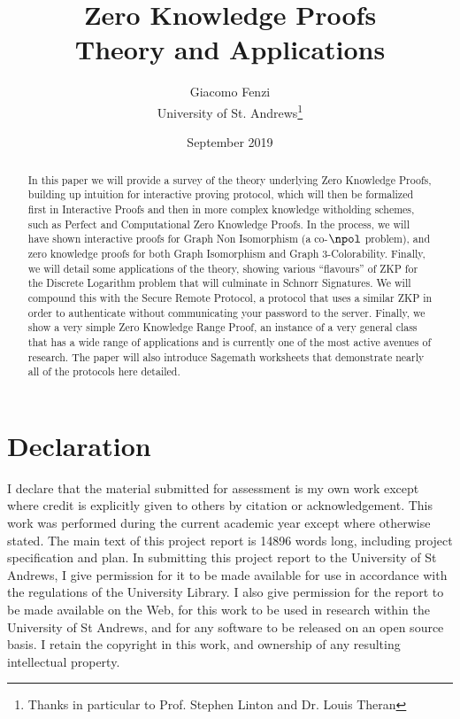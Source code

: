 \documentclass{article}
\title{Zero Knowledge Proofs \\ Theory and Applications}
\author{Giacomo Fenzi \\ University of St. Andrews\thanks{Thanks in particular to Prof. Stephen Linton and Dr. Louis Theran}}
\date{September 2019}
\begin{document}
\maketitle
\newpage

\begin{abstract}
    In this paper we will provide a survey of the theory underlying Zero Knowledge Proofs,
    building up intuition for interactive proving protocol, which will then be formalized first in Interactive Proofs
    and then in more complex knowledge witholding schemes, such as Perfect and Computational Zero Knowledge Proofs.
    In the process, we will have shown interactive proofs for Graph Non Isomorphism (a co-$\npol$ problem),
    and zero knowledge proofs for both Graph Isomorphism and Graph 3-Colorability.
    Finally, we will detail some applications of the theory, showing various \enquote{flavours} of ZKP for the Discrete Logarithm problem that will culminate in
    Schnorr Signatures. We will compound this with the Secure Remote Protocol, a protocol that uses a similar ZKP in order
    to authenticate without communicating your password to the server. Finally, we show a very simple Zero Knowledge
    Range Proof, an instance of a very general class that has a wide range of applications and is currently one of the most active avenues of research.
    The paper will also introduce Sagemath worksheets that demonstrate nearly all of the protocols here detailed.
\end{abstract}

\section*{Declaration}
I declare that the material submitted for assessment is my own work except where credit is explicitly given to others
by citation or acknowledgement.
This work was performed during the current academic year except where otherwise stated.
The main text of this project report is 14896 words long, including project specification and plan.
In submitting this project report to the University of St Andrews, I give permission for it to be made available for use
in accordance with the regulations of the University Library. I also give permission for the report to be made
available on the Web, for this work to be used in research within the University of St Andrews,
and for any software to be released on an open source basis. I retain the copyright in this work, and ownership of any
resulting intellectual property.

\tableofcontents
\end{document}
